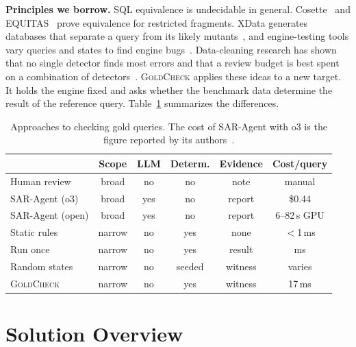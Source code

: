 \documentclass[conference]{IEEEtran}
\newcommand{\sys}{\textsc{GoldCheck}}
\begin{document}
\textbf{Principles we borrow.} SQL equivalence is undecidable in general.
Cosette~\cite{chu2017cosette} and EQUITAS~\cite{zhou2019equitas} prove
equivalence for restricted fragments. XData generates databases that separate a
query from its likely mutants~\cite{chandra2015xdata}, and engine-testing tools
vary queries and states to find engine bugs~\cite{rigger2020pqs,rigger2020tlp}.
Data-cleaning research has shown that no single detector finds most errors and
that a review budget is best spent on a combination of
detectors~\cite{abedjan2016detecting,chu2016cleaning,rekatsinas2017holoclean,krishnan2016activeclean}.
\sys{} applies these ideas to a new target. It holds the engine fixed and asks
whether the benchmark data determine the result of the reference query.
Table~\ref{tab:approaches} summarizes the differences.

\begin{table}[t]
\caption{Approaches to checking gold queries. The cost of SAR-Agent with o3 is
the figure reported by its authors~\cite{jin2026pervasive}.}
\label{tab:approaches}
\centering
\footnotesize
\setlength{\tabcolsep}{3pt}
\begin{tabular}{@{}lccccc@{}}
\toprule
 & Scope & LLM & Determ. & Evidence & Cost/query \\
\midrule
Human review & broad & no & no & note & manual \\
SAR-Agent (o3) & broad & yes & no & report & \$0.44 \\
SAR-Agent (open) & broad & yes & no & report & 6--82\,s GPU \\
Static rules & narrow & no & yes & none & $<$1\,ms \\
Run once & narrow & no & yes & result & ms \\
Random states & narrow & no & seeded & witness & varies \\
\sys{} & narrow & no & yes & witness & 17\,ms \\
\bottomrule
\end{tabular}
\end{table}

\section{Solution Overview}
\label{sec:overview}
\end{document}
